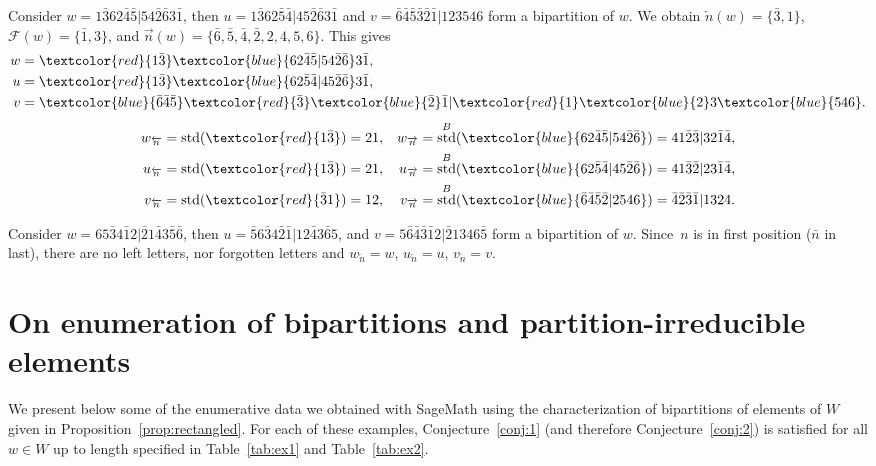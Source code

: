 \documentclass[Unicode]{cedram-alco}
\theoremstyle{definition}
\DeclareMathOperator{\std}{std}
\newcommand{\R}{{\overrightarrow{n}}}
\newcommand{\LL}{{\overleftarrow{n}}}
\newcommand{\Bstd}{\std^{B}}
\newcommand{\F}{\mathcal{F}}
\newcommand{\red}[1]{\textcolor{red}{#1}}
\newcommand{\blue}[1]{\textcolor{blue}{#1}}
\begin{document}
\begin{ex}
\label{ex:typeB-neg1}
Consider $w = 1 \bar{3} 6 2 \bar{4} \bar{5} | 5 4 \bar{2} \bar{6} 3 \bar{1}$, then $u = 1 \bar{3} 6 2 \bar{5} \bar{4} | 4 5 \bar{2} \bar{6} 3 \bar{1}$ and $v = \bar{6} \bar{4} \bar{5} \bar{3} \bar{2} \bar{1} | 1 2 3 5 4 6$ form a bipartition of $w$.  We obtain $\LL(w) = \lbrace \bar{3}, 1 \rbrace$, $\F(w) = \lbrace \bar{1}, 3 \rbrace$, and $\R(w) = \lbrace \bar{6}, \bar{5}, \bar{4}, \bar{2}, 2, 4, 5, 6 \rbrace$. This gives
\begin{align*}
w &= \red{1 \bar{3}} \blue{ 6 2 \bar{4} \bar{5} | 5 4 \bar{2} \bar{6}} 3 \bar{1}, \\
u &= \red{1 \bar{3}} \blue{ 6 2 \bar{5} \bar{4} | 4 5 \bar{2} \bar{6}} 3 \bar{1}, \\
v &= \blue{\bar{6} \bar{4} \bar{5}} \red{\bar{3}} \blue{\bar{2}} \bar{1} | \red{1} \blue{2} 3 \blue{5 4 6}.
\end{align*}
\begin{align*}
w_\LL &= \std(\red{1 \bar{3}}) = 2 1, & w_\R &= \Bstd(\blue{6 2 \bar{4} \bar{5} | 5 4 \bar{2} \bar{6}}) = 4 1 \bar{2} \bar{3} | 3 2 \bar{1} \bar{4}, \\
u_\LL &= \std(\red{1 \bar{3}}) = 2 1, & u_\R &= \Bstd(\blue{6 2 \bar{5} \bar{4} | 4 5 \bar{2} \bar{6}}) = 4 1 \bar{3} \bar{2} | 2 3 \bar{1} \bar{4}, \\
v_\LL &= \std(\red{\bar{3} 1}) = 1 2, & v_\R &= \Bstd(\blue{\bar{6} \bar{4} \bar{5} \bar{2} | 2 5 4 6}) = \bar{4} \bar{2} \bar{3} \bar{1} | 1 3 2 4. 
\end{align*}
\end{ex}

\begin{ex}
\label{ex:typeB-neg2}
Consider $w = 6 5 \bar{3} 4 \bar{1} 2 | \bar{2} 1 \bar{4} 3 \bar{5} \bar{6}$, then $u = \bar{5} 6 \bar{3} 4 \bar{2} \bar{1} | 1 2 \bar{4} 3 \bar{6} 5$, and $v = 5 \bar{6} \bar{4} \bar{3} \bar{1} 2 | \bar{2} 1 3 4 6 \bar{5}$ form a bipartition of $w$.  Since~$n$ is in first position ($\bar{n}$ in last), there are no left letters, nor forgotten letters and $w_\LL = w$, $u_\LL =u$, $v_\LL = v$.
\end{ex}



\section{On  enumeration of bipartitions and partition-irreducible elements}\label{ss:Computations}

We present below some of the enumerative data we obtained with SageMath using the characterization of bipartitions of elements of $W$ given in Proposition~\ref{prop:rectangled}. For each of these examples, Conjecture~\ref{conj:1} (and therefore Conjecture~\ref{conj:2}) is satisfied for all $w\in W$ up to length specified in Table~\ref{tab:ex1} and Table~\ref{tab:ex2}. 
\end{document}
